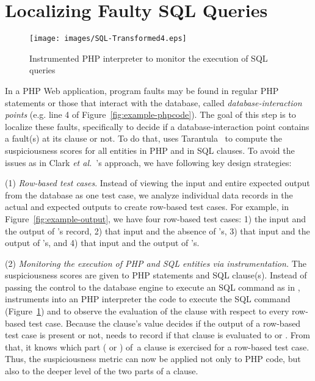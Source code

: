 \section{Localizing Faulty SQL Queries}


\begin{figure}[tbp]
  \centering
  \texttt{[image: images/SQL-Transformed4.eps]} %
 \caption{Instrumented PHP interpreter to monitor the execution of SQL queries~\cite{icsm13}}\label{fig:SQL-Transformed}
\end{figure}

In a PHP Web application, program faults may be found in regular PHP
statements or those that interact with the database, called
\emph{database-interaction points} (e.g. line 4 of
Figure~\ref{fig:example-phpcode}). The goal of this step is to
localize these faults, specifically to decide if a
database-interaction point contains a fault(s) at its 
clause or not. To do that, {\tool} uses
Tarantula~\cite{tarantula05} to compute the suspiciousness scores for
all entities in PHP and in SQL  clauses. To avoid the
issues as in Clark {\em et al.}~\cite{ga-ase11}'s approach, we have
following key design strategies:

(1) {\em Row-based test cases}. 
Instead of viewing the input and entire expected output from the
database as one test case, we analyze individual data records in
the actual and expected outputs to create row-based test cases. For
example, in Figure~\ref{fig:example-output}, we have four row-based test
cases: 1) the input  and the output of 's record, 2) that
input and the absence of 's, 3) that input and the output of
's, and 4) that input and the output of 's.

(2) {\em Monitoring the execution of PHP and SQL entities via
instrumentation.} The suspiciousness scores are given to PHP
statements and SQL  clause(s). Instead of passing the
control to the database engine to execute an SQL command as in 
\cite{ga-ase11}, {\tool} instruments into an PHP interpreter the code
to execute the SQL command (Figure~\ref{fig:SQL-Transformed}) and to
observe the evaluation of the  clause with respect to
every row-based test case.  Because the  clause's value
decides if the output of a row-based test case is present or not,
{\tool} needs to record if that clause is evaluated to  or
. From that, it knows which part ( or
) of~a  clause is exercised for a row-based
test case. Thus, the suspiciousness metric can now be applied not only
to PHP code, but also to the deeper level of the two parts of a
 clause.

